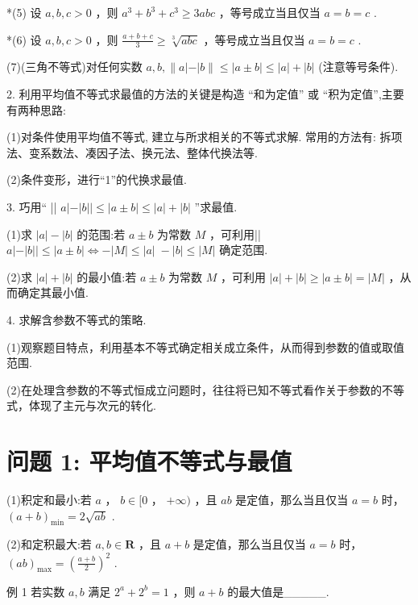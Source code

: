 \documentclass[10pt]{article}
\begin{document}
*(5) 设 \(a,b,c > 0\) ，则 \({a}^{3} + {b}^{3} + {c}^{3} \geq  {3abc}\) ，等号成立当且仅当 \(a = b = c\) .

*(6) 设 \(a,b,c > 0\) ，则 \(\frac{a + b + c}{3} \geq  \sqrt[3]{abc}\) ，等号成立当且仅当 \(a = b = c\) .

(7)(三角不等式)对任何实数 \(a,b,\parallel a\left| -\right| b\parallel  \leq  \left| {a \pm  b}\right|  \leq  \left| a\right|  + \left| b\right|\) (注意等号条件).

2. 利用平均值不等式求最值的方法的关键是构造 “和为定值” 或 “积为定值”,主要有两种思路:

(1)对条件使用平均值不等式, 建立与所求相关的不等式求解. 常用的方法有: 拆项法、变系数法、凑因子法、换元法、整体代换法等.

(2)条件变形，进行“1”的代换求最值.

3. 巧用“ || \(a\left| -\right| b\left| \right|  \leq  \left| {a \pm  b}\right|  \leq  \left| a\right|  + \left| b\right|\) ”求最值.

(1)求 \(\left| a\right|  - \left| b\right|\) 的范围:若 \(a \pm  b\) 为常数 \(M\) ，可利用|| \(a\left| -\right| b\left| \right|  \leq  \left| {a \pm  b}\right|  \Leftrightarrow   - \left| M\right|  \leq  \left| a\right| \; - \left| b\right|  \leq  \left| M\right|\) 确定范围.

(2)求 \(\left| a\right|  + \left| b\right|\) 的最小值:若 \(a \pm  b\) 为常数 \(M\) ，可利用 \(\left| a\right|  + \left| b\right|  \geq  \left| {a \pm  b}\right|  = \left| M\right|\) ，从而确定其最小值.

4. 求解含参数不等式的策略.

(1)观察题目特点，利用基本不等式确定相关成立条件，从而得到参数的值或取值范围.

(2)在处理含参数的不等式恒成立问题时，往往将已知不等式看作关于参数的不等式，体现了主元与次元的转化.

\section*{问题 1: 平均值不等式与最值}

(1)积定和最小:若 \(a\) ， \(b \in  \lbrack 0\) ， \(+ \infty )\) ，且 \({ab}\) 是定值，那么当且仅当 \(a = b\) 时， \({\left( a + b\right) }_{\min } = 2\sqrt{ab}\) .

(2)和定积最大:若 \(a,b \in  \mathbf{R}\) ，且 \(a + b\) 是定值，那么当且仅当 \(a = b\) 时， \({\left( ab\right) }_{\max } = {\left( \frac{a + b}{2}\right) }^{2}\) .

例 1 若实数 \(a,b\) 满足 \({2}^{a} + {2}^{b} = 1\) ，则 \(a + b\) 的最大值是\_\_\_\_\_.
\end{document}
